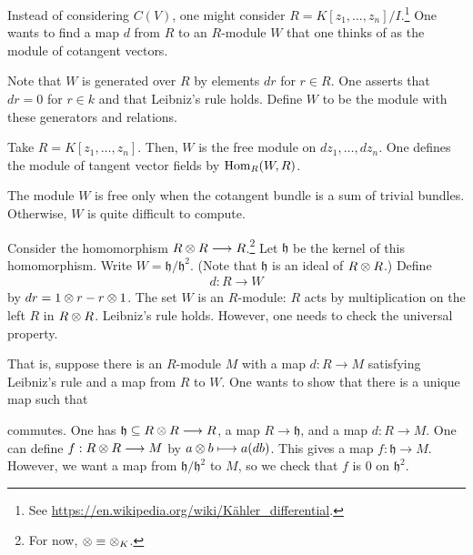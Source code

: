 \documentclass [11 pt, oneside] {article}
\begin{document}
Instead of considering $C(V)$, one might consider $R=K[z_1,\hdots, z_n]/I$.\footnote{See \url{https://en.wikipedia.org/wiki/Kähler_differential}.} One wants to find a map $d$ from $R$ to an $R$-module $W$ that one thinks of as the module of cotangent vectors.

Note that $W$ is generated over $R$ by elements $dr$ for $r\in R$. One asserts that $dr=0$ for $r\in k$ and that Leibniz's rule holds. Define $W$ to be the module with these generators and relations.

\begin{example}[ ]\label{}\text{}
Take $R=K[z_1,\hdots, z_n]$. Then, $W$ is the free module on $dz_1,\hdots, dz_n$. One defines the module of tangent vector fields by $\operatorname{Hom}_{R}(W, R)$.
\end{example}

\begin{remark}
	The module $W$ is free only when the cotangent bundle is a sum of trivial bundles. Otherwise, $W$ is quite difficult to compute.
\end{remark}

Consider the homomorphism $R\otimes R\longrightarrow R$.\footnote{For now, $\otimes\equiv\otimes_K$.} Let $\mathfrak{h}$ be the kernel of this homomorphism. Write $W = \mathfrak{h}/\mathfrak{h}^2$. (Note that $\mathfrak{h}$ is an ideal of $R\otimes R$.) Define 
\begin{align*}
	d :R\longrightarrow W
\end{align*}
by $dr = 1\otimes r - r\otimes 1$. The set $W$ is an $R$-module: $R$ acts by multiplication on the left $R$ in $R\otimes R$. Leibniz's rule holds. However, one needs to check the universal property.

That is, suppose there is an $R$-module $M$ with a map $d:R\longrightarrow M$ satisfying Leibniz's rule and a map from $R$ to $W$. One wants to show that there is a unique map such that
\begin{center}
\end{center}
commutes. One has $\mathfrak{h}\subseteq R\otimes R\longrightarrow R$, a map $R\longrightarrow \mathfrak{h}$, and a map $d:R\longrightarrow M$. One can define $f:R\otimes R\longrightarrow M$ by $a\otimes b \longmapsto a(db)$. This gives a map $f:\mathfrak{h}\longrightarrow M$. However, we want a map from $\mathfrak{h}/\mathfrak{h}^2$ to $M$, so we check that $f$ is $0$ on $\mathfrak{h}^2$.
\end{document}
